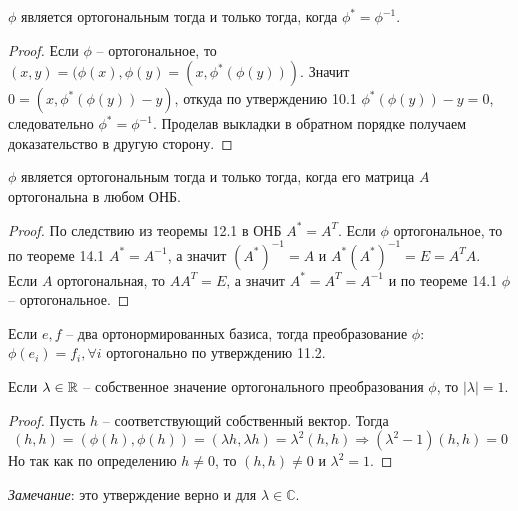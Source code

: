 \begin{theorem}
    $\phi$ является ортогональным тогда и только тогда, когда $\phi^*=\phi^{-1}$.
\end{theorem}
\begin{proof}
    Если $\phi$ -- ортогональное, то $(x,y)=(\phi(x),\phi(y)=(x,\phi^*(\phi(y)))$. Значит $0=(x, \phi^*(\phi(y))-y)$, откуда по утверждению 10.1 $\phi^*(\phi(y))-y=0$, следовательно $\phi^*=\phi^{-1}$. Проделав выкладки в обратном порядке получаем доказательство в другую сторону.
\end{proof}
\begin{theorem}
    $\phi$ является ортогональным тогда и только тогда, когда его матрица $A$ ортогональна в любом ОНБ.
\end{theorem}
\begin{proof}
    По следствию из теоремы 12.1 в ОНБ $A^*=A^T$. Если $\phi$ ортогональное, то по теореме 14.1 $A^*=A^{-1}$, а значит $(A^*)^{-1}=A$ и $A^*(A^*)^{-1}=E=A^TA$. Если $A$ ортогональная, то $AA^T=E$, а значит $A^*=A^T=A^{-1}$ и по теореме 14.1 $\phi$ -- ортогональное.
\end{proof}

Если $e,f$ -- два ортонормированных базиса, тогда преобразование $\phi$: $\phi(e_i)=f_i, \forall i$ ортогонально по утверждению 11.2.
\begin{proposition}
    Если $\lambda \in \mathbb{R}$ -- собственное значение ортогонального преобразования $\phi$, то $|\lambda|=1$.
\end{proposition}
\begin{proof}
    Пусть $h$ -- соответствующий собственный вектор. Тогда 
    \[
    (h,h)=(\phi(h), \phi(h))=(\lambda h,\lambda h)=\lambda^2(h,h)\Rightarrow (\lambda^2-1)(h,h)=0
    \]
    Но так как по определению $h\neq 0$, то $(h,h)\neq0$ и $\lambda^2=1$.
\end{proof}
\textit{Замечание}: это утверждение верно и для $\lambda\in\mathbb{C}$.